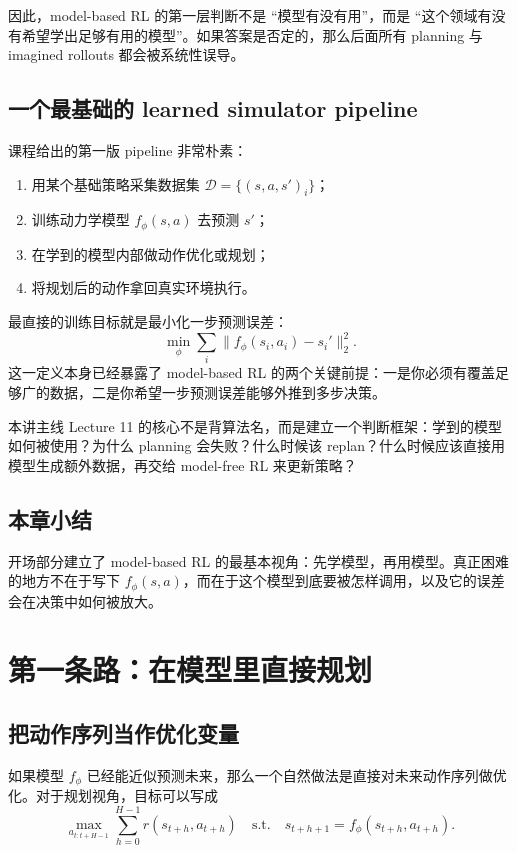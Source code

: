 \documentclass[a4paper]{article}
\begin{document}
因此，model-based RL 的第一层判断不是 ``模型有没有用''，而是 ``这个领域有没有希望学出足够有用的模型''。如果答案是否定的，那么后面所有 planning 与 imagined rollouts 都会被系统性误导。

\subsection{一个最基础的 learned simulator pipeline}

课程给出的第一版 pipeline 非常朴素：

\begin{enumerate}
\item 用某个基础策略采集数据集 $\mathcal{D}=\{(s,a,s')_i\}$；
\item 训练动力学模型 $f_\phi(s,a)$ 去预测 $s'$；
\item 在学到的模型内部做动作优化或规划；
\item 将规划后的动作拿回真实环境执行。
\end{enumerate}

最直接的训练目标就是最小化一步预测误差：
\[
\min_\phi \sum_i \|f_\phi(s_i,a_i)-s_i'\|_2^2.
\]
这一定义本身已经暴露了 model-based RL 的两个关键前提：一是你必须有覆盖足够广的数据，二是你希望一步预测误差能够外推到多步决策。

\begin{knowledgebox}{本讲主线}
Lecture 11 的核心不是背算法名，而是建立一个判断框架：学到的模型如何被使用？为什么 planning 会失败？什么时候该 replan？什么时候应该直接用模型生成额外数据，再交给 model-free RL 来更新策略？
\end{knowledgebox}

\subsection{本章小结}

开场部分建立了 model-based RL 的最基本视角：先学模型，再用模型。真正困难的地方不在于写下 $f_\phi(s,a)$，而在于这个模型到底要被怎样调用，以及它的误差会在决策中如何被放大。

\section{第一条路：在模型里直接规划}

\subsection{把动作序列当作优化变量}

如果模型 $f_\phi$ 已经能近似预测未来，那么一个自然做法是直接对未来动作序列做优化。对于规划视角，目标可以写成
\[
\max_{a_{t:t+H-1}} \sum_{h=0}^{H-1} r(s_{t+h}, a_{t+h})
\quad
\text{s.t.}\quad
s_{t+h+1}=f_\phi(s_{t+h},a_{t+h}).
\]
\end{document}
